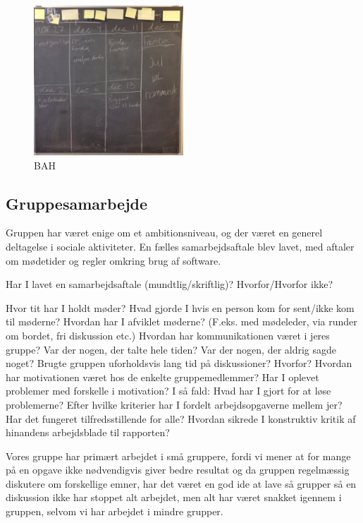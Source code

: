 \documentclass[a4paper,12pt,twoside,openright]{memoir}
\begin{document}
            \begin{figure}[ht!]
                \centering
                \includegraphics[width=0.5\textwidth]{Images/2.jpg}
                \caption{BAH}
                \label{4}
            \end{figure}

        \subsection{Gruppesamarbejde}
            
            Gruppen har været enige om et ambitionsniveau, og der været en generel deltagelse i sociale aktiviteter. En fælles samarbejdsaftale blev lavet, med aftaler om mødetider og regler omkring brug af software.

            Har I lavet en samarbejdsaftale (mundtlig/skriftlig)? Hvorfor/Hvorfor ikke? 
            
            Hvor tit har I holdt møder?  
            Hvad gjorde I hvis en person kom for sent/ikke kom til møderne? 
            Hvordan har I afviklet møderne? (F.eks. med mødeleder, via runder om bordet, fri diskussion etc.) 
            Hvordan har kommunikationen været i jeres gruppe? Var der nogen, der talte hele tiden? Var der nogen, der aldrig sagde noget? Brugte gruppen uforholdsvis lang tid på diskussioner? Hvorfor? 
            Hvordan har motivationen været hos de enkelte gruppemedlemmer? Har I oplevet problemer med forskelle i motivation? I så fald: Hvad har I gjort for at løse problemerne? 
            Efter hvilke kriterier har I fordelt arbejdsopgaverne mellem jer? Har det fungeret tilfredsstillende for alle? 
            Hvordan sikrede I konstruktiv kritik af hinandens arbejdsblade til rapporten? 



            Vores gruppe har primært arbejdet i små gruppere, fordi vi mener at for mange på en opgave ikke nødvendigvis giver bedre resultat og da gruppen regelmæssig diskutere om forskellige emner, har det været en god ide at lave så grupper så en diskussion ikke har stoppet alt arbejdet, men alt har været snakket igennem i gruppen, selvom vi har arbejdet i mindre grupper. 
\end{document}
